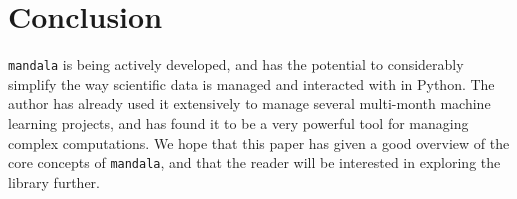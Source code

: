 \documentclass{article} %
\begin{document}
\section{Conclusion}
\label{section:conclusion}

\texttt{mandala} is being actively developed, and has the potential to
considerably simplify the way scientific data is managed and interacted with in
Python. The author has already used it extensively to manage several multi-month
machine learning projects, and has found it to be a very powerful tool for
managing complex computations. We hope that this paper has given a good overview
of the core concepts of \texttt{mandala}, and that the reader will be interested
in exploring the library further.




\end{document}

